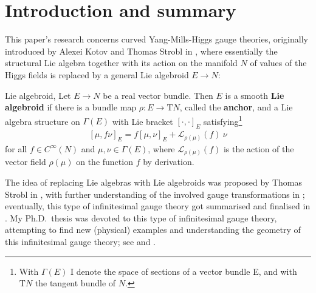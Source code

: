 \documentclass[a4paper,oneside,11pt,bibliography=totoc]{scrartcl}
\theoremstyle{plain}
\theoremstyle{remark}
\theoremstyle{definition}
\begin{document}



\tableofcontents




\renewcommand{\thefootnote}{\arabic{footnote}}
%
\setlength{\parindent}{12 pt}



\section{Introduction and summary}

This paper's research concerns curved Yang-Mills-Higgs gauge theories, originally introduced by Alexei Kotov and Thomas Strobl in \cite{CurvedYMH}, where essentially the structural Lie algebra together with its action on the manifold $N$ of values of the Higgs fields is replaced by a general Lie algebroid $E \to N$:

\begin{definitions*}{Lie algebroid,  \cite[reduced definition of \S 16.1, page 113]{DaSilva}}
Let $E \to N$ be a real vector bundle. Then $E$ is a smooth \textbf{Lie algebroid} if there is a bundle map $\rho: E \to \mathrm{T}N$, called the \textbf{anchor}, and a Lie algebra structure on $\Gamma(E)$ with Lie bracket $\left[ \cdot, \cdot \right]_E$ satisfying\footnote{With $\Gamma(E)$ I denote the space of sections of a vector bundle E, and with $\mathrm{T}N$ the tangent bundle of $N$.}
\begin{align*}
  \left[\mu, f \nu\right]_E = f \left[\mu, \nu\right]_E + \mathcal{L}_{\rho(\mu)}(f) ~ \nu
\end{align*}
for all $f \in C^\infty(N)$ and $\mu, \nu \in \Gamma(E)$, where $\mathcal{L}_{\rho(\mu)}(f)$ is the action of the vector field $\rho(\mu)$ on the function $f$ by derivation.
\end{definitions*}

The idea of replacing Lie algebras with Lie algebroids was proposed by Thomas Strobl in \cite{OriginofCYMH}, with further understanding of the involved gauge transformations in \cite{mayer2009lie}; eventually, this type of infinitesimal gauge theory got summarised and finalised in \cite{CurvedYMH}. My Ph.D.\ thesis was devoted to this type of infinitesimal gauge theory, attempting to find new (physical) examples and understanding the geometry of this infinitesimal gauge theory; see \cite{My1stpaper} and \cite{MyThesis}.
\end{document}
